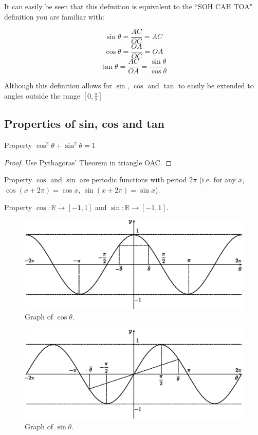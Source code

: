 It can easily be seen that this definition is equivalent to the ``SOH CAH TOA" definition you are familiar with:

\begin{in_a_box}
$$\sin\theta=\frac{AC}{OC}=AC$$
$$\cos\theta=\frac{OA}{OC}=OA$$
$$\tan\theta=\frac{AC}{OA}=\frac{\sin\theta}{\cos\theta}$$
\end{in_a_box}

Although this definition allows for $\sin$, $\cos$ and $\tan$ to easily be extended to angles outside the range $\left[0,\frac{\pi}{2}\right]$

\subsection{Properties of sin, cos and tan}
\begin{thing}{Property}
$\cos^2\theta+\sin^2\theta=1$
\begin{proof}
Use Pythagoras' Theorem in triangle OAC.
\end{proof}
\end{thing}

\begin{thing}{Property}
$\cos$ and $\sin$ are periodic functions with period $2\pi$ (i.e. for any $x$, $\cos(x+2\pi)=\cos x$, $\sin(x+2\pi)=\sin x$).
\end{thing}

\begin{thing}{Property}
$\cos : \mathbb{R}\to[-1,1]$ and $\sin : \mathbb{R}\to[-1,1]$.
\end{thing}

\begin{figure}[H]
\centering
\includegraphics[scale=0.75]{img/cos}
\caption{Graph of $\cos\theta$.}
\label{fig:cos}
\end{figure}

\begin{figure}[H]
\centering
\includegraphics[scale=0.75]{img/sin}
\caption{Graph of $\sin\theta$.}
\label{fig:sin}
\end{figure}

